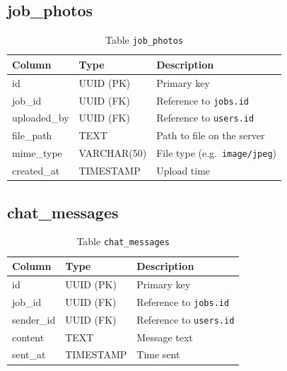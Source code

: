 \subsection{job\_photos}
\begin{table}[H]
  \centering
  \begin{tabularx}{\textwidth}{llX}
    \toprule
    \textbf{Column} & \textbf{Type} & \textbf{Description} \\
    \midrule
    id           & UUID (PK)   & Primary key \\
    job\_id      & UUID (FK)   & Reference to \texttt{jobs.id} \\
    uploaded\_by & UUID (FK)   & Reference to \texttt{users.id} \\
    file\_path   & TEXT        & Path to file on the server \\
    mime\_type   & VARCHAR(50) & File type (e.g.\ \texttt{image/jpeg}) \\
    created\_at  & TIMESTAMP   & Upload time \\
    \bottomrule
  \end{tabularx}
  \caption{Table \texttt{job\_photos}}
\end{table}

\subsection{chat\_messages}
\begin{table}[H]
  \centering
  \begin{tabularx}{\textwidth}{llX}
    \toprule
    \textbf{Column} & \textbf{Type} & \textbf{Description} \\
    \midrule
    id         & UUID (PK)  & Primary key \\
    job\_id    & UUID (FK)  & Reference to \texttt{jobs.id} \\
    sender\_id & UUID (FK)  & Reference to \texttt{users.id} \\
    content    & TEXT       & Message text \\
    sent\_at   & TIMESTAMP  & Time sent \\
    \bottomrule
  \end{tabularx}
  \caption{Table \texttt{chat\_messages}}
\end{table}

